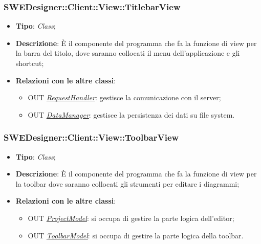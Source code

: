 \documentclass[../SpecificaTecnica.tex]{subfiles}
\begin{document}
				\subsubsection{SWEDesigner::Client::View::TitlebarView}
					\hypertarget{SWEDesigner::Client::View::TitlebarView}{}
					\begin{itemize}
						\item \textbf{Tipo}: \emph{Class};
						\item \textbf{Descrizione}: È il componente del programma che fa la funzione di view per la barra del titolo, dove saranno collocati il menu dell’applicazione e gli shortcut;
						\item \textbf{Relazioni con le altre classi}:
						\begin{itemize}
							\item OUT \hyperlink{SWEDesigner::Model::RequestHandler}{\emph{RequestHandler}}: gestisce la comunicazione con il server;
							\item OUT \hyperlink{SWEDesigner::Model::DataManager}{\emph{DataManager}}: gestisce la persistenza dei dati su file system.
						\end{itemize}
					\end{itemize}

				\subsubsection{SWEDesigner::Client::View::ToolbarView}
					\hypertarget{SWEDesigner::Client::View::ToolbarView}{}
					\begin{itemize}
						\item \textbf{Tipo}: \emph{Class};
						\item \textbf{Descrizione}: È il componente del programma che fa la funzione di view per la toolbar dove saranno collocati gli strumenti per editare i diagrammi;
						\item \textbf{Relazioni con le altre classi}:
						\begin{itemize}
							\item OUT \hyperlink{SWEDesigner::Model::ProjectModel}{\emph{ProjectModel}}: si occupa di gestire la parte logica dell'editor;
							\item OUT \hyperlink{SWEDesigner::Model::ToolbarModel}{\emph{ToolbarModel}}: si occupa di gestire la parte logica della toolbar.
						\end{itemize}
					\end{itemize}
\end{document}
